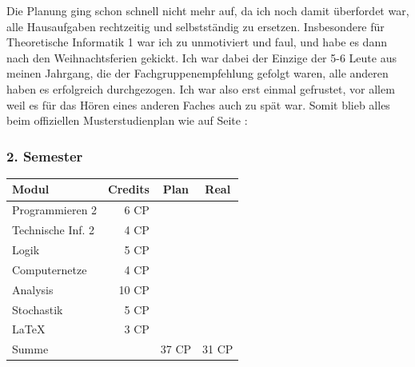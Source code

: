 \begin{multicols}{2}
Die Planung ging schon schnell nicht mehr auf, da ich noch damit
überfordet war, alle Hausaufgaben rechtzeitig und selbstständig zu
ersetzen. Insbesondere für Theoretische Informatik 1 war ich zu
unmotiviert und faul, und habe es dann nach den Weihnachtsferien
gekickt. Ich war dabei der Einzige der 5-6 Leute aus meinen Jahrgang,
die der Fachgruppenempfehlung gefolgt waren, alle anderen haben es
erfolgreich durchgezogen. Ich war also erst einmal gefrustet, vor
allem weil es für das Hören eines anderen Faches auch zu spät
war. Somit blieb alles beim offiziellen Musterstudienplan wie auf
Seite \pageref{musterstudienplan}:\\

\subsubsection*{2. Semester}
{
\footnotesize
\begin{tabular}{|l|r|c|c|}
\hline \textbf{Modul}		& \textbf{Credits} 	& \textbf{Plan} & \textbf{Real} \\ 
\hline
\hline Programmieren 2 		& 6 CP 				& \nx 			& 	 	\\ 
\hline Technische Inf. 2	& 4 CP 				& \nx 			& 	 	\\ 
\hline Logik 				& 5 CP 				& \nx 			& \nx 	\\ 
\hline Computernetze 		& 4 CP 				& \nx 			& \nx 	\\ 
\hline Analysis 			& 10 CP 			& \nx 			& \nx	\\ 
\hline Stochastik 			& 5 CP 				& \nx 			& \nx 	\\ 
\hline \LaTeX\ 				& 3 CP 				& \nx 			& \nx 	\\ 
\hline
\hline Summe 				&  					& 37 CP 		& 31 CP \\ 
\hline 
\end{tabular}
}


\end{multicols}
